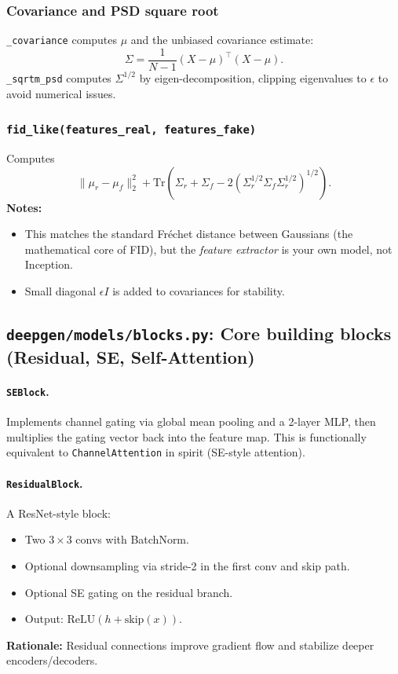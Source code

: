 \subsubsection*{Covariance and PSD square root}
\texttt{\_covariance} computes \(\mu\) and the unbiased covariance estimate:
\[
\Sigma=\frac{1}{N-1}(X-\mu)^\top(X-\mu).
\]
\texttt{\_sqrtm\_psd} computes \(\Sigma^{1/2}\) by eigen-decomposition, clipping eigenvalues to \(\epsilon\) to avoid numerical issues.

\subsubsection*{\texttt{fid\_like(features\_real, features\_fake)}}
Computes
\[
\|\mu_r-\mu_f\|_2^2 + \mathrm{Tr}\left(\Sigma_r+\Sigma_f-2(\Sigma_r^{1/2}\Sigma_f\Sigma_r^{1/2})^{1/2}\right).
\]
\textbf{Notes:}
\begin{itemize}
  \item This matches the standard Fr\'echet distance between Gaussians (the mathematical core of FID), but the \emph{feature extractor} is your own model, not Inception.
  \item Small diagonal \(\epsilon I\) is added to covariances for stability.
\end{itemize}

\subsection{\texttt{deepgen/models/blocks.py}: Core building blocks (Residual, SE, Self-Attention)}
\label{subsec:code_blocks}

\paragraph{\texttt{SEBlock}.}
Implements channel gating via global mean pooling and a 2-layer MLP, then multiplies the gating vector back into the feature map. This is functionally equivalent to \texttt{ChannelAttention} in spirit (SE-style attention).

\paragraph{\texttt{ResidualBlock}.}
A ResNet-style block:
\begin{itemize}
  \item Two \(3\times 3\) convs with BatchNorm.
  \item Optional downsampling via stride-2 in the first conv and skip path.
  \item Optional SE gating on the residual branch.
  \item Output: \(\mathrm{ReLU}(h+\text{skip}(x))\).
\end{itemize}
\textbf{Rationale:} Residual connections improve gradient flow and stabilize deeper encoders/decoders.


